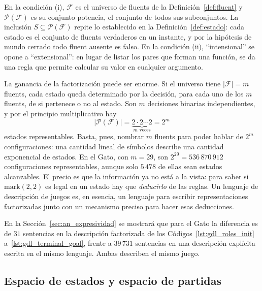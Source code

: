 En la condición (i), $\mathcal F$ es el universo de fluents de la Definición~\ref{def:fluent} y $\mathcal P(\mathcal F)$ es su conjunto potencia, el conjunto de todos sus subconjuntos. La inclusión $S \subseteq \mathcal P(\mathcal F)$ repite lo establecido en la Definición~\ref{def:estado}: cada estado es el conjunto de fluents verdaderos en un instante, y por la hipótesis de mundo cerrado todo fluent ausente es falso. En la condición (ii), ``intensional'' se opone a ``extensional'': en lugar de listar los pares que forman una función, se da una regla que permite calcular su valor en cualquier argumento.

La ganancia de la factorización puede ser enorme. Si el universo tiene $|\mathcal F| = m$ fluents, cada estado queda determinado por la decisión, para cada uno de los $m$ fluents, de si pertenece o no al estado. Son $m$ decisiones binarias independientes, y por el principio multiplicativo hay
\begin{equation}
    |\mathcal P(\mathcal F)| = \underbrace{2 \cdot 2 \cdots 2}_{m \text{ veces}} = 2^m
    \label{eq:an_potencia}
\end{equation}
estados representables. Basta, pues, nombrar $m$ fluents para poder hablar de $2^m$ configuraciones: una cantidad lineal de símbolos describe una cantidad exponencial de estados. En el Gato, con $m = 29$, son $2^{29} = 536\,870\,912$ configuraciones representables, aunque solo $5\,478$ de ellas sean estados alcanzables. El precio es que la información ya no está a la vista: para saber si $\text{mark}(2,2)$ es legal en un estado hay que \emph{deducirlo} de las reglas. Un lenguaje de descripción de juegos es, en esencia, un lenguaje para escribir representaciones factorizadas junto con un mecanismo preciso para hacer esas deducciones.

\begin{observacion}
En la Sección~\ref{sec:an_expresividad} se mostrará que para el Gato la diferencia es de $31$ sentencias en la descripción factorizada de los Códigos~\ref{lst:gdl_roles_init} a~\ref{lst:gdl_terminal_goal}, frente a $39\,731$ sentencias en una descripción explícita escrita en el mismo lenguaje. Ambas describen el mismo juego.
\end{observacion}

\subsection{Espacio de estados y espacio de partidas}
\label{subsec:an_estados_partidas}

